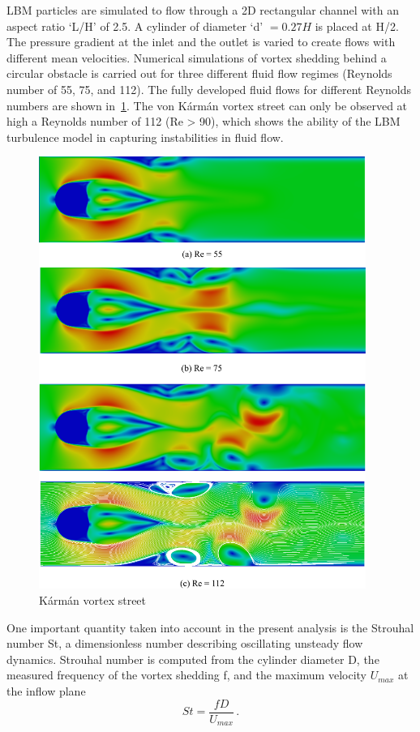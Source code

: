 LBM particles are simulated to flow through a 2D rectangular channel with an 
aspect ratio `L/H' of 2.5. A cylinder of diameter `d' $=0.27H$ is placed at 
H/2. The pressure gradient at the inlet and the outlet is varied to create 
flows with different mean velocities. Numerical simulations of vortex 
shedding behind a circular obstacle is carried out for three different fluid 
flow regimes (Reynolds number of 55, 75, and 112). The fully developed fluid 
flows for different Reynolds numbers are shown in~\cref{fig:karman}. The von 
K\'{a}rm\'{a}n vortex street can only be observed at high a Reynolds number of 
112 (Re > 90), which shows the ability of the LBM turbulence model in capturing 
instabilities in fluid flow.
%
\begin{figure}[htbp]
	\centering
	\includegraphics[width=0.95\textwidth]{karman}
	\caption{K\'{a}rm\'{a}n vortex street}
	\label{fig:karman}
\end{figure}

One important quantity taken into account in the present analysis is the 
Strouhal number St, a dimensionless number describing oscillating unsteady 
flow dynamics. Strouhal number is computed from the cylinder diameter D, 
the measured frequency of the vortex shedding f, and the maximum velocity 
$U_{max}$ at the inflow plane
%
\begin{equation}
St=\frac{fD}{U_{max}}\,.
\end{equation}

